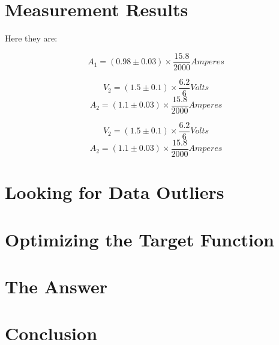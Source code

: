 \documentclass[11pt]{memoir}
\newcommand{\initialCurrentDispersion}{0.03}
\newcommand{\initialVoltageDispersion}{0.1}
\newcommand{\voltageConvertingFrac}{\frac{6.2}{6}}
\newcommand{\currentConvertingFrac}{\frac{15.8}{2000}}
\begin{document}
    \section{Measurement Results}\label{sec:measurement-results}

    Here they are:

    \begin{equation*}
        A_1 = \left( 0.98 \pm \initialCurrentDispersion \right) \times \currentConvertingFrac Amperes
    \end{equation*}

    \begin{equation*}
        V_2 = \left( 1.5 \pm \initialVoltageDispersion \right) \times \voltageConvertingFrac Volts
    \end{equation*}
    \begin{equation*}
        A_2 = \left( 1.1 \pm \initialCurrentDispersion \right) \times \currentConvertingFrac Amperes
    \end{equation*}

    \begin{equation*}
        V_2 = \left( 1.5 \pm \initialVoltageDispersion \right) \times \voltageConvertingFrac Volts
    \end{equation*}
    \begin{equation*}
        A_2 = \left( 1.1 \pm \initialCurrentDispersion \right) \times \currentConvertingFrac Amperes
    \end{equation*}




    \section {Looking for Data Outliers}\label{sec:looking-for-data-outliers}

    \section{Optimizing the Target Function}\label{sec:optimizing-the-target-function}


    \section{The Answer}\label{sec:answer}


    \section{Conclusion}\label{sec:conclusion}
\end{document}
